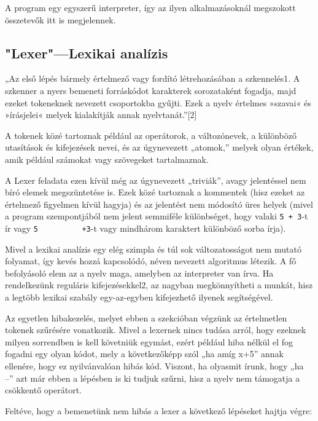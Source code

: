 A program egy egyszerű interpreter, így az ilyen alkalmazásoknál megszokott összetevők itt is megjelennek.

\subsection{"Lexer"—Lexikai analízis}

„Az első lépés bármely értelmező vagy fordító létrehozásában a szkennelés1. A szkenner a nyers bemeneti forráskódot karakterek sorozataként fogadja, majd ezeket tokeneknek nevezett csoportokba gyűjti. Ezek a nyelv értelmes »szavai« és »írásjelei« melyek kialakítják annak nyelvtanát.”[2]

A tokenek közé tartoznak például az operátorok, a változónevek, a különböző utasítások és kifejezések nevei, és az úgynevezett „atomok,” melyek olyan értékek, amik például számokat vagy szövegeket tartalmaznak.

A Lexer feladata ezen kívül még az úgynevezett „triviák”, avagy jelentéssel nem bíró elemek megszüntetése is. Ezek közé tartoznak a kommentek (hisz ezeket az értelmező figyelmen kívül hagyja) és az jelentést nem módosító üres helyek (mivel a program szempontjából nem jelent semmiféle különbséget, hogy valaki \verb|5 + 3|-t ír vagy \verb|5          +3|-t vagy mindhárom karaktert különböző sorba írja).

Mivel a lexikai analízis egy elég szimpla és túl sok változatosságot nem mutató folyamat, így kevés hozzá kapcsolódó, néven nevezett algoritmus létezik. A fő befolyásoló elem az a nyelv maga, amelyben az interpreter van írva. Ha rendelkezünk reguláris kifejezésekkel2, az nagyban megkönnyítheti a munkát, hisz a legtöbb lexikai szabály egy-az-egyben kifejezhető ilyenek segítségével.

Az egyetlen hibakezelés, melyet ebben a szekcióban végzünk az értelmetlen tokenek szűrésére vonatkozik. Mivel a lexernek nincs tudása arról, hogy ezeknek milyen sorrendben is kell követniük egymást, ezért például hiba nélkül el fog fogadni egy olyan kódot, mely a következőképp szól „ha amíg x+5” annak ellenére, hogy ez nyilvánvalóan hibás kód. Viszont, ha olyasmit írunk, hogy „ha --” azt már ebben a lépésben is ki tudjuk szűrni, hisz a nyelv nem támogatja a csökkentő operátort.

Feltéve, hogy a bemenetünk nem hibás a lexer a következő lépéseket hajtja végre:

